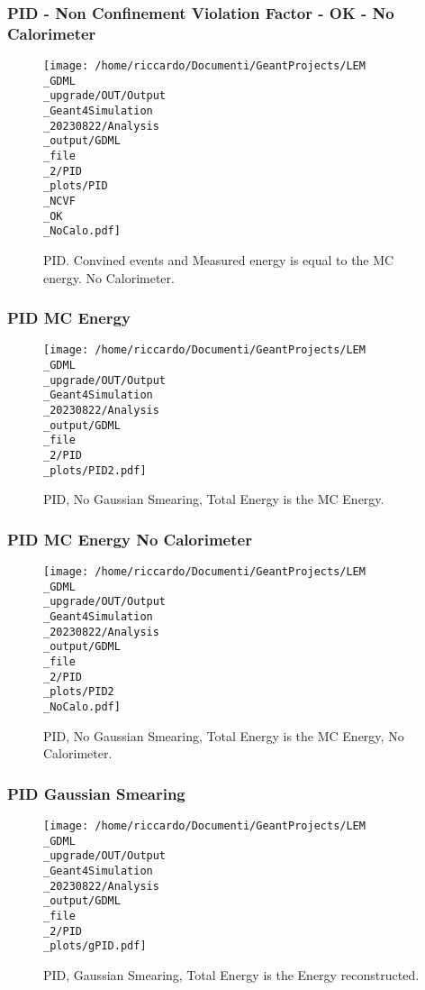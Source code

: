 \documentclass[8pt]{beamer}
\begin{document}
            \begin{frame}
                \frametitle{PID - Non Confinement Violation Factor - OK - No Calorimeter}
            
        \begin{figure}[h]
            \centering
            \texttt{[image: /home/riccardo/Documenti/GeantProjects/LEM\\\_GDML\\\_upgrade/OUT/Output\\\_Geant4Simulation\\\_20230822/Analysis\\\_output/GDML\\\_file\\\_2/PID\\\_plots/PID\\\_NCVF\\\_OK\\\_NoCalo.pdf]}
            \caption{PID. Convined events and Measured energy is equal to the MC energy. No Calorimeter.}
        \end{figure}
        
            \end{frame}
            
            \begin{frame}
                \frametitle{PID MC Energy}
            
        \begin{figure}[h]
            \centering
            \texttt{[image: /home/riccardo/Documenti/GeantProjects/LEM\\\_GDML\\\_upgrade/OUT/Output\\\_Geant4Simulation\\\_20230822/Analysis\\\_output/GDML\\\_file\\\_2/PID\\\_plots/PID2.pdf]}
            \caption{PID, No Gaussian Smearing, Total Energy is the MC Energy.}
        \end{figure}
        
            \end{frame}
            
            \begin{frame}
                \frametitle{PID MC Energy No Calorimeter}
            
        \begin{figure}[h]
            \centering
            \texttt{[image: /home/riccardo/Documenti/GeantProjects/LEM\\\_GDML\\\_upgrade/OUT/Output\\\_Geant4Simulation\\\_20230822/Analysis\\\_output/GDML\\\_file\\\_2/PID\\\_plots/PID2\\\_NoCalo.pdf]}
            \caption{PID, No Gaussian Smearing, Total Energy is the MC Energy, No Calorimeter.}
        \end{figure}
        
            \end{frame}
            
            \begin{frame}
                \frametitle{PID Gaussian Smearing}
            
        \begin{figure}[h]
            \centering
            \texttt{[image: /home/riccardo/Documenti/GeantProjects/LEM\\\_GDML\\\_upgrade/OUT/Output\\\_Geant4Simulation\\\_20230822/Analysis\\\_output/GDML\\\_file\\\_2/PID\\\_plots/gPID.pdf]}
            \caption{PID, Gaussian Smearing, Total Energy is the Energy reconstructed.}
        \end{figure}
        
            \end{frame}
            
\end{document}
